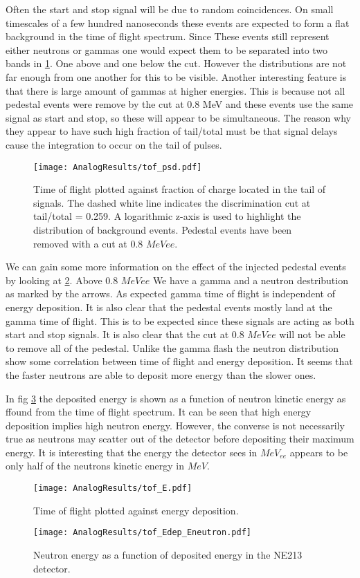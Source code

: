 \documentclass[main.tex]{subfiles}
\begin{document}
Often the start and stop signal will be due to random coincidences. On small timescales of a few hundred nanoseconds these events are expected to form a flat background in the time of flight spectrum. Since These events still represent either neutrons or gammas one would expect them to be separated into two bands in \ref{fig:tof_ps_a}. One above and one below the cut. However the distributions are not far enough from one another for this to be visible.
Another interesting feature is that there is large amount of gammas at higher energies. This is because not all pedestal events were remove by the cut at 0.8 MeV and these events use the same signal as start and stop, so these will appear to be simultaneous. The reason why they appear to have such high fraction of tail/total must be that signal delays cause the integration to occur on the tail of pulses.
\begin{figure}[ht]
    \centering
        \texttt{[image: AnalogResults/tof\_psd.pdf]}
        \caption{Time of flight plotted against fraction of charge located in the tail of signals. The dashed white line indicates the discrimination cut at tail/total = 0.259. A logarithmic z-axis is used to highlight the distribution of background events. Pedestal events have been removed with a cut at 0.8 $MeV{ee}$.}
    \label{fig:tof_ps_a} 
\end{figure}

We can gain some more information on the effect of the injected pedestal events by looking at \ref{fig:tof_E_a}. Above 0.8 $MeV{ee}$ We have a gamma and a neutron destribution as marked by the arrows. As expected gamma time of flight is independent of energy deposition. It is also clear that the pedestal events mostly land at the gamma time of flight. This is to be expected since these signals are acting as both start and stop signals. It is also clear that the cut at 0.8 $MeV{ee}$ will not be able to remove all of the pedestal. Unlike the gamma flash the neutron distribution show some correlation between time of flight and energy deposition. It seems that the faster neutrons are able to deposit more energy than the slower ones.

In fig \ref{fig:tof_Edep_Eneutron_a} the deposited energy is shown as a function of neutron kinetic energy as ffound from the time of flight spectrum. It can be seen that high energy deposition implies high neutron energy. However, the converse is not necessarily true as neutrons may scatter out of the detector before depositing their maximum energy. It is interesting that the energy the detector sees in $MeV_{ee}$ appears to be only half of the neutrons kinetic energy in  $MeV$.

\begin{figure}[ht]
    \centering
        \texttt{[image: AnalogResults/tof\_E.pdf]}
        \caption{Time of flight plotted against energy deposition.}
    \label{fig:tof_E_a} 
\end{figure}

\begin{figure}[ht]
    \centering
        \texttt{[image: AnalogResults/tof\_Edep\_Eneutron.pdf]}
        \caption{Neutron energy as a function of deposited energy in the NE213 detector.}
    \label{fig:tof_Edep_Eneutron_a} 
\end{figure}
\end{document}
